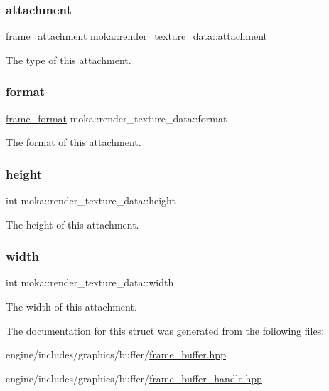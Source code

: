 \subsubsection{\texorpdfstring{attachment}{attachment}}
{\footnotesize\ttfamily \mbox{\hyperlink{namespacemoka_a0a44ecbb877dec1107d9915dc95c58d1}{frame\+\_\+attachment}} moka\+::render\+\_\+texture\+\_\+data\+::attachment}

The type of this attachment. \mbox{\label{structmoka_1_1render__texture__data_ae56a3f19593dad95cbfa1c221c5fdbfd}} 
\subsubsection{\texorpdfstring{format}{format}}
{\footnotesize\ttfamily \mbox{\hyperlink{namespacemoka_a2ce6b5e22cd8e423713ef76033a279de}{frame\+\_\+format}} moka\+::render\+\_\+texture\+\_\+data\+::format}

The format of this attachment. \mbox{\label{structmoka_1_1render__texture__data_ad90dbd689d2120a67bb911ba0f845594}} 
\subsubsection{\texorpdfstring{height}{height}}
{\footnotesize\ttfamily int moka\+::render\+\_\+texture\+\_\+data\+::height}

The height of this attachment. \mbox{\label{structmoka_1_1render__texture__data_af62ca60f7ffc4314c16e948d3ce5cede}} 
\subsubsection{\texorpdfstring{width}{width}}
{\footnotesize\ttfamily int moka\+::render\+\_\+texture\+\_\+data\+::width}

The width of this attachment. 

The documentation for this struct was generated from the following files\+:\begin{DoxyCompactItemize}
\item 
engine/includes/graphics/buffer/\mbox{\hyperlink{frame__buffer_8hpp}{frame\+\_\+buffer.\+hpp}}\item 
engine/includes/graphics/buffer/\mbox{\hyperlink{frame__buffer__handle_8hpp}{frame\+\_\+buffer\+\_\+handle.\+hpp}}\end{DoxyCompactItemize}
